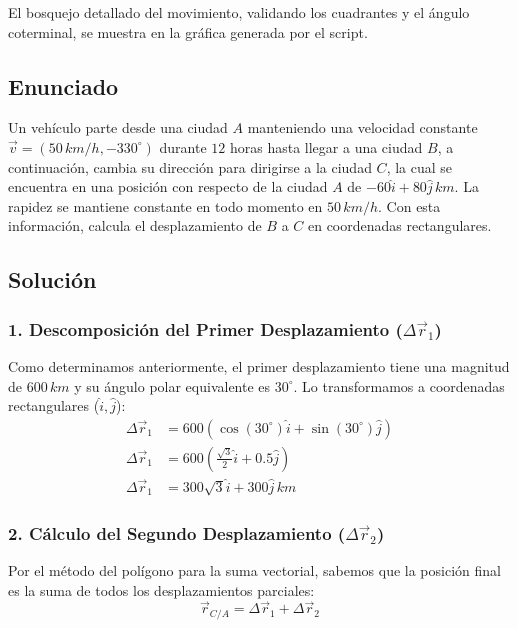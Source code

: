 \documentclass[12pt, a4paper]{article}
\begin{document}
\begin{tcolorbox}[colback=green!5!white, colframe=green!50!black, title=Respuesta Final]
\centering El bosquejo detallado del movimiento, validando los cuadrantes y el ángulo coterminal, se muestra en la gráfica generada por el script.
\end{tcolorbox}

\newpage

\subsection*{Enunciado}
Un vehículo parte desde una ciudad $A$ manteniendo una velocidad constante $\vec{v} = (50 \, \si{km/h}, -330^\circ)$ durante $12$ horas hasta llegar a una ciudad $B$, a continuación, cambia su dirección para dirigirse a la ciudad $C$, la cual se encuentra en una posición con respecto de la ciudad $A$ de $-60\hat{i} + 80\hat{j} \, \si{km}$. La rapidez se mantiene constante en todo momento en $50 \, \si{km/h}$. Con esta información, calcula el desplazamiento de $B$ a $C$ en coordenadas rectangulares.

\subsection*{Solución}

\subsubsection*{1. Descomposición del Primer Desplazamiento ($\Delta\vec{r}_1$)}
Como determinamos anteriormente, el primer desplazamiento tiene una magnitud de $600 \, \si{km}$ y su ángulo polar equivalente es $30^\circ$. Lo transformamos a coordenadas rectangulares ($\hat{i}, \hat{j}$):
\begin{align*}
    \Delta\vec{r}_1 &= 600 (\cos(30^\circ)\hat{i} + \sin(30^\circ)\hat{j}) \\
    \Delta\vec{r}_1 &= 600 \left(\frac{\sqrt{3}}{2}\hat{i} + 0.5\hat{j}\right) \\
    \Delta\vec{r}_1 &= 300\sqrt{3}\hat{i} + 300\hat{j} \, \si{km}
\end{align*}

\subsubsection*{2. Cálculo del Segundo Desplazamiento ($\Delta\vec{r}_2$)}
Por el método del polígono para la suma vectorial, sabemos que la posición final es la suma de todos los desplazamientos parciales:
$$ \vec{r}_{C/A} = \Delta\vec{r}_1 + \Delta\vec{r}_2 $$
\end{document}
